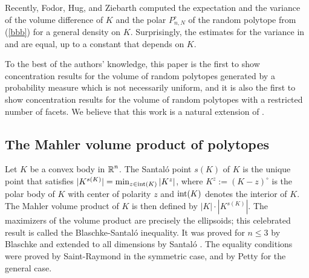Recently, Fodor, Hug, and Ziebarth \cite{fodor2016volume} computed the expectation and the variance of the volume difference of $K$ and the polar  $ P_{n,N}^{\circ}$ of the random polytope from (\ref{bbb})  for a general density on $K$. 
Surprisingly, the estimates for the variance in \cite{reitzner2003random} and  \cite{fodor2016volume} are equal, up to a constant that depends on $ K.$ 

To the best of the authors' knowledge, this paper is the first  to show concentration results for the volume of random polytopes generated by a probability measure which is not necessarily  uniform, and it is also the first to show concentration results for the volume of random polytopes with a restricted number of facets. We believe that this work is a natural extension of \cite{boroczky2004approximation}.

\subsection{The Mahler volume product of polytopes}

Let $K$ be a convex body in $\operatorname{\mathbb{R}}^n$. The Santal\'o point $s(K)$ of $K$ is the unique point that satisfies $|K^{s(K)}|=\min_{z\in\operatorname{int}(K)}|K^z|$, where  $K^z:=(K-z)^\circ$ is the polar body of $K$ with center of polarity $z$ and $\operatorname{int}(K)$ denotes the interior of $K$. %
The Mahler volume product  of $K$ is then defined by $|K|\cdot|K^{s(K)}|$. The maximizers of the volume product are precisely the ellipsoids; this celebrated result is called the Blaschke-Santal\'o inequality. It was proved for $n\leq 3$ by Blaschke \cite{Blaschke1917,Blaschke1918} and extended to all dimensions by Santal\'o \cite{santalo1949}. The equality conditions were proved by Saint-Raymond \cite{saintraymond1981} in the symmetric case, and by Petty \cite{petty1985} for the general case.  

